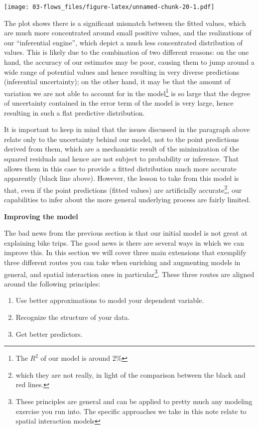 \documentclass[]{book}
\providecommand{\tightlist}{%
  \setlength{\itemsep}{0pt}\setlength{\parskip}{0pt}}
\let\rmarkdownfootnote\footnote%
\def\footnote{\protect\rmarkdownfootnote}
\begin{document}
\texttt{[image: 03-flows\_files/figure-latex/unnamed-chunk-20-1.pdf]}

The plot shows there is a significant mismatch between the fitted values, which are much more concentrated around small positive values, and the realizations of our ``inferential engine'', which depict a much less concentrated distribution of values. This is likely due to the combination of two different reasons: on the one hand, the accuracy of our estimates may be poor, causing them to jump around a wide range of potential values and hence resulting in very diverse predictions (inferential uncertainty); on the other hand, it may be that the amount of variation we are not able to account for in the model\footnote{The \(R^2\) of our model is around 2\%} is so large that the degree of uncertainty contained in the error term of the model is very large, hence resulting in such a flat predictive distribution.

It is important to keep in mind that the issues discussed in the paragraph above relate only to the uncertainty behind our model, not to the point predictions derived from them, which are a mechanistic result of the minimization of the squared residuals and hence are not subject to probability or inference. That allows them in this case to provide a fitted distribution much more accurate apparently (black line above). However, the lesson to take from this model is that, even if the point predictions (fitted values) are artificially accurate\footnote{which they are not really, in light of the comparison between the black and red lines.}, our capabilities to infer about the more general underlying process are fairly limited.

\textbf{Improving the model}

The bad news from the previous section is that our initial model is not great at explaining bike trips. The good news is there are several ways in which we can improve this. In this section we will cover three main extensions that exemplify three different routes you can take when enriching and augmenting models in general, and spatial interaction ones in particular\footnote{These principles are general and can be applied to pretty much any modeling exercise you run into. The specific approaches we take in this note relate to spatial interaction models}. These three routes are aligned around the following principles:

\begin{enumerate}
\def\labelenumi{\arabic{enumi}.}
\tightlist
\item
  Use better approximations to model your dependent variable.
\item
  Recognize the structure of your data.
\item
  Get better predictors.
\end{enumerate}
\end{document}
